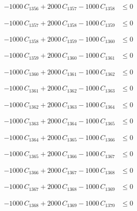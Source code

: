\documentclass[a4paper,11pt]{article}
\begin{document}
\begin{align}
-1000\,C_{1356} + 2000\,C_{1357} - 1000\,C_{1358} &\leq 0 \nonumber
\end{align}

\begin{align}
-1000\,C_{1357} + 2000\,C_{1358} - 1000\,C_{1359} &\leq 0 \nonumber
\end{align}

\begin{align}
-1000\,C_{1358} + 2000\,C_{1359} - 1000\,C_{1360} &\leq 0 \nonumber
\end{align}

\begin{align}
-1000\,C_{1359} + 2000\,C_{1360} - 1000\,C_{1361} &\leq 0 \nonumber
\end{align}

\begin{align}
-1000\,C_{1360} + 2000\,C_{1361} - 1000\,C_{1362} &\leq 0 \nonumber
\end{align}

\begin{align}
-1000\,C_{1361} + 2000\,C_{1362} - 1000\,C_{1363} &\leq 0 \nonumber
\end{align}

\begin{align}
-1000\,C_{1362} + 2000\,C_{1363} - 1000\,C_{1364} &\leq 0 \nonumber
\end{align}

\begin{align}
-1000\,C_{1363} + 2000\,C_{1364} - 1000\,C_{1365} &\leq 0 \nonumber
\end{align}

\begin{align}
-1000\,C_{1364} + 2000\,C_{1365} - 1000\,C_{1366} &\leq 0 \nonumber
\end{align}

\begin{align}
-1000\,C_{1365} + 2000\,C_{1366} - 1000\,C_{1367} &\leq 0 \nonumber
\end{align}

\begin{align}
-1000\,C_{1366} + 2000\,C_{1367} - 1000\,C_{1368} &\leq 0 \nonumber
\end{align}

\begin{align}
-1000\,C_{1367} + 2000\,C_{1368} - 1000\,C_{1369} &\leq 0 \nonumber
\end{align}

\begin{align}
-1000\,C_{1368} + 2000\,C_{1369} - 1000\,C_{1370} &\leq 0 \nonumber
\end{align}
\end{document}
